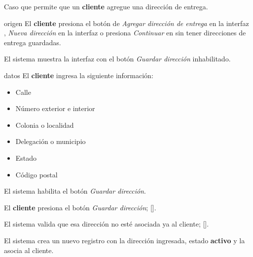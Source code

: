 %
%

{
  Caso que permite que un \textbf{cliente} agregue una dirección de entrega.

  \begin{trayectoriaPrincipal}

    \item[origen] El \textbf{cliente} presiona el botón de
      \textit{Agregar dirección de entrega} en la interfaz
      ,
      \textit{Nueva dirección} en
      la interfaz  o
      presiona \textit{Continuar} en
       sin tener direcciones
      de entrega guardadas.

    \item El sistema muestra la interfaz
       con el botón
      \textit{Guardar dirección} inhabilitado.

    \item[datos] El \textbf{cliente} ingresa la siguiente información:
      \begin{itemize}
        \item Calle
        \item Número exterior e interior
        \item Colonia o localidad
        \item Delegación o municipio
        \item Estado
        \item Código postal
      \end{itemize}

    \item El sistema habilita el botón \textit{Guardar dirección}.

    \item El \textbf{cliente} presiona el botón \textit{Guardar dirección};
      [].

    \item El sistema valida que esa dirección no esté asociada ya al cliente;
      [].

    \item El sistema crea un nuevo registro con la dirección ingresada,
      estado \textbf{activo} y la asocia al cliente.


\end{trayectoriaPrincipal}}
